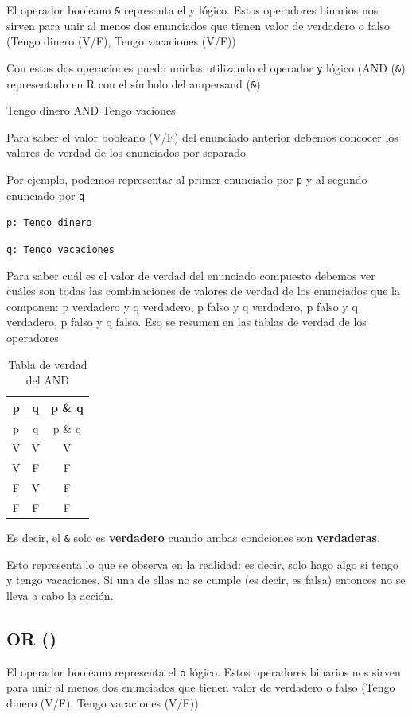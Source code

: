 \documentclass[
]{book}
\begin{document}
El operador booleano \texttt{\&} representa el y lógico. Estos operadores binarios nos sirven para unir al menos dos enunciados que tienen valor de verdadero o falso (Tengo dinero (V/F), Tengo vacaciones (V/F))

Con estas dos operaciones puedo unirlas utilizando el operador \texttt{y} lógico (AND (\texttt{\&}) representado en R con el símbolo del ampersand (\texttt{\&})

Tengo dinero AND Tengo vaciones

Para saber el valor booleano (V/F) del enunciado anterior debemos concocer los valores de verdad de los enunciados por separado

Por ejemplo, podemos representar al primer enunciado por \texttt{p} y al segundo enunciado por \texttt{q}

\texttt{p:\ Tengo\ dinero}

\texttt{q:\ Tengo\ vacaciones}

Para saber cuál es el valor de verdad del enunciado compuesto debemos ver cuáles son todas las combinaciones de valores de verdad de los enunciados que la componen: p verdadero y q verdadero, p falso y q verdadero, p falso y q verdadero, p falso y q falso. Eso se resumen en las tablas de verdad de los operadores

\begin{longtable}[]{@{}ccc@{}}
\caption{Tabla de verdad del AND}\tabularnewline
\toprule
p & q & p \& q \\
\midrule
\endfirsthead
\toprule
p & q & p \& q \\
\midrule
\endhead
V & V & V \\
V & F & F \\
F & V & F \\
F & F & F \\
\bottomrule
\end{longtable}

Es decir, el \texttt{\&} solo es \textbf{verdadero} cuando ambas condciones son \textbf{verdaderas}.

Esto representa lo que se observa en la realidad: es decir, solo hago algo si tengo y tengo vacaciones. Si una de ellas no se cumple (es decir, es falsa) entonces no se lleva a cabo la acción.

\hypertarget{or}{%
\subsection{OR (\textbar)}\label{or}}

El operador booleano \texttt{\textbar{}} representa el \texttt{o} lógico. Estos operadores binarios nos sirven para unir al menos dos enunciados que tienen valor de verdadero o falso (Tengo dinero (V/F), Tengo vacaciones (V/F))
\end{document}
